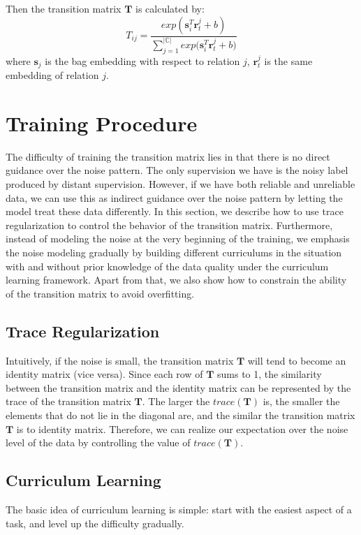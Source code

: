 Then the transition matrix $\mathbf{T}$ is calculated by:
\begin{equation}
T_{ij} = \frac{exp({\mathbf{s}_i^T \mathbf{r}_t^j  + b})}{\sum_{j=1}^{|\mathbb{C}|}{exp(\mathbf{s}_i^T \mathbf{r}_t^j + b})}
\end{equation}
where $\mathbf{s}_j$ is the bag embedding with respect to relation $j$, $\mathbf{r}_t^j$ is the same embedding of relation $j$. 


\section{Training Procedure} 
The difficulty of training the transition matrix lies in that there is no direct guidance over the noise pattern. The only supervision we have is the noisy label produced by distant supervision. However, if we have both reliable and unreliable data, we can use this as indirect guidance over the noise pattern by letting the model treat these data differently. In this section, we describe how to use trace regularization to control the behavior of the transition matrix. Furthermore, instead of modeling the noise at the very beginning of the training, we emphasis the noise modeling gradually by building different curriculums in the situation with and without prior knowledge of the data quality under the curriculum learning framework. Apart from that, we also show how to constrain the ability of the transition matrix to avoid overfitting.

\subsection{Trace Regularization}
Intuitively, if the noise is small, the transition matrix $\mathbf{T}$ will tend to become an identity matrix (vice versa).  Since each row of $\mathbf{T}$ sums to 1, the similarity between the transition matrix and the identity matrix can be represented by the trace of the transition matrix $\mathbf{T}$. The larger the $trace(\mathbf{T})$ is, the smaller the elements that do not lie in the diagonal are, and the similar the transition matrix $\mathbf{T}$ is to identity matrix. Therefore, we can realize our expectation over the noise level of the data by controlling the value of $trace(\mathbf{T})$.

\subsection{Curriculum Learning}
The basic idea of curriculum learning is simple: start with the easiest aspect of a task, and level up the difficulty gradually. 

